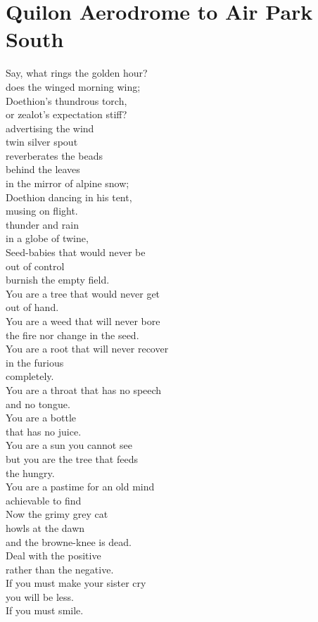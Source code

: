 \documentclass[smalldemyvopaper,11pt,twoside,onecolumn,openright,extrafontsizes]{memoir}
\begin{document}
\chapter{Quilon Aerodrome to Air Park South}
Say, what rings the golden hour?
\\does the winged morning wing;
\\Doethion's thundrous torch,
\\or zealot's expectation stiff?
\\advertising the wind
\\twin silver spout
\\reverberates the beads
\\behind the leaves
\\in the mirror of alpine snow;
\\Doethion dancing in his tent,
\\musing on flight.
\\thunder and rain
\\in a globe of twine,
\\Seed-babies that would never be
\\out of control
\\burnish the empty field.
\\You are a tree that would never get
\\out of hand.
\\You are a weed that will never bore
\\the fire nor change in the seed.
\\You are a root that will never recover
\\in the furious
\\completely.
\\You are a throat that has no speech
\\and no tongue.
\\You are a bottle
\\that has no juice.
\\You are a sun you cannot see
\\but you are the tree that feeds
\\the hungry.
\\You are a pastime for an old mind
\\achievable to find
\\Now the grimy grey cat
\\howls at the dawn
\\and the browne-knee is dead.
\\Deal with the positive
\\rather than the negative.
\\If you must make your sister cry
\\you will be less.
\\If you must smile.
\end{document}
